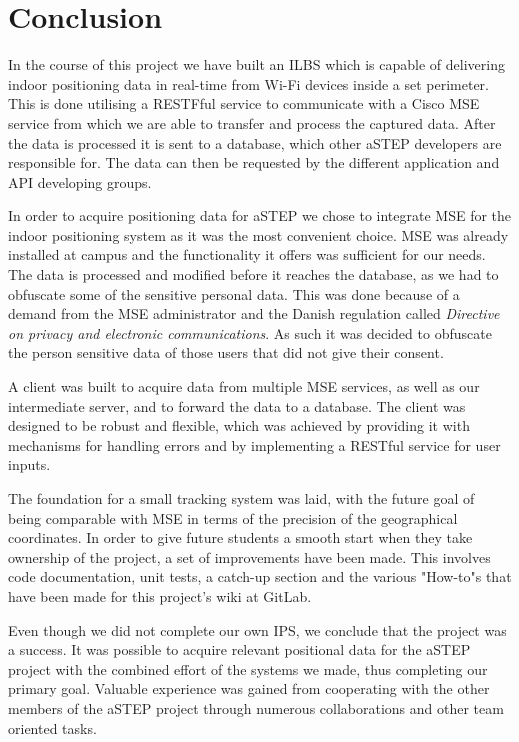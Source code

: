 \chapter{Conclusion}
In the course of this project we have built an ILBS which is capable of delivering indoor positioning data in real-time from Wi-Fi devices inside a set perimeter. This is done utilising a RESTFful service to communicate with a Cisco MSE service from which we are able to transfer and process the captured data. After the data is processed it is sent to a database, which other aSTEP developers are responsible for. The data can then be requested by the different application and API developing groups.

In order to acquire positioning data for aSTEP we chose to integrate MSE for the indoor positioning system as it was the most convenient choice. MSE was already installed at campus and the functionality it offers was sufficient for our needs. The data is processed and modified before it reaches the database, as we had to obfuscate some of the sensitive personal data. This was done because of a demand from the MSE administrator and the Danish regulation called \textit{Directive on privacy and electronic communications}. As such it was decided to obfuscate the person sensitive data of those users that did not give their consent.

A client was built to acquire data from multiple MSE services, as well as our intermediate server, and to forward the data to a database. The client was designed to be robust and flexible, which was achieved by providing it with mechanisms for handling errors and by implementing a RESTful service for user inputs.

The foundation for a small tracking system was laid, with the future goal of being comparable with MSE in terms of the precision of the geographical coordinates. %
In order to give future students a smooth start when they take ownership of the project, a set of improvements have been made. This involves code documentation, unit tests, a catch-up section and the various "How-to"s that have been made for this project's wiki at GitLab. 

Even though we did not complete our own IPS, we conclude that the project was a success. It was possible to acquire relevant positional data for the aSTEP project with the combined effort of the systems we made, thus completing our primary goal. Valuable experience was gained from cooperating with the other members of the aSTEP project through numerous collaborations and other team oriented tasks.
